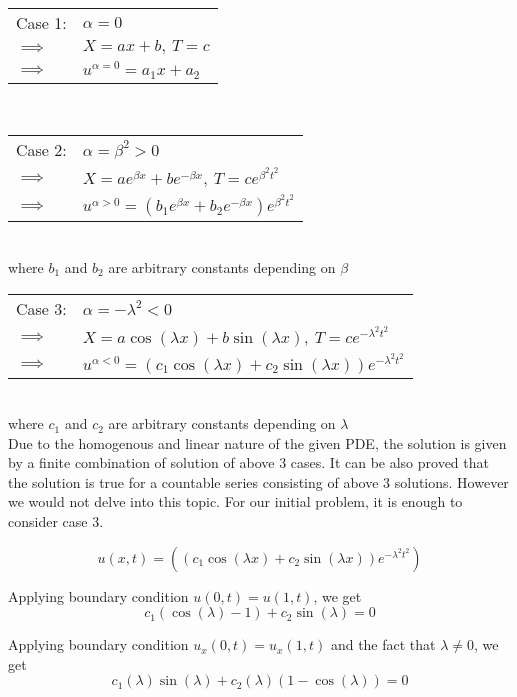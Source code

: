 \documentclass[12pt]{article}
\begin{document}
	\begin{tabular}{l l}
		Case 1: & $\alpha = 0$ \\
		$\implies$ & $X=ax+b, \ T=c$ \\
		$\implies$ & $u^{\alpha=0}=a_1 x + a_2$
	\end{tabular} \\
	
	\begin{tabular}{l l}
		Case 2: & $\alpha = \beta^2 > 0$ \\
		$\implies$ & $X=ae^{\beta x}+be^{-\beta x}, \ T=ce^{\beta^2 t^2}$ \\
		$\implies$ & $u^{\alpha>0}=(b_1e^{\beta x}+b_2e^{-\beta x})e^{\beta^2 t^2}$
	\end{tabular} \\

	where $b_1$ and $b_2$ are arbitrary constants depending on $\beta$ \\
	
	\begin{tabular}{l l}
		Case 3: & $\alpha = -\lambda^2 < 0$ \\
		$\implies$ & $X=a\cos({\lambda x})+b\sin({\lambda x}), \ T=ce^{-\lambda^2 t^2}$ \\
		$\implies$ & $u^{\alpha<0}=(c_1\cos({\lambda x})+c_2\sin({\lambda x}))e^{-\lambda^2 t^2}$
	\end{tabular} \\
	
	where $c_1$ and $c_2$ are arbitrary constants depending on $\lambda$ \\
	
	Due to the homogenous and linear nature of the given PDE, the solution is given by a finite combination of solution of above 3 cases. It can be also proved that the solution is true for a countable series consisting of above 3 solutions. However we would not delve into this topic. For our initial problem, it is enough to consider case 3.
	
	\begin{equation}
	u(x,t) = ((c_1\cos({\lambda x})+c_2\sin({\lambda x}))e^{-\lambda^2 t^2})
	\end{equation}	
		
	Applying boundary condition $u(0,t) = u(1,t)$, we get		
	\begin{equation} \label{eq1}
	c_1(\cos({\lambda })-1)+c_2\sin({\lambda}) = 0
	\end{equation} 
	
	Applying boundary condition $u_x(0,t)=u_x(1,t)$ and the fact that $\lambda \neq 0$, we get	
	\begin{equation} \label{eq2}
	c_1(\lambda)\sin(\lambda) + c_2(\lambda)(1-\cos(\lambda))=0 \end{equation}
	
\end{document}
